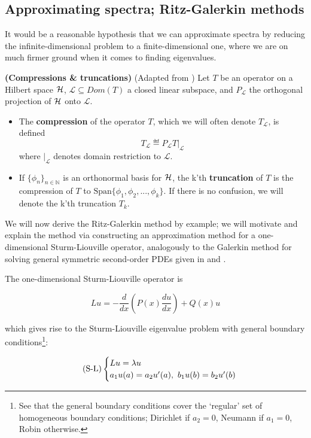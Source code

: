 \documentclass[../main.tex]{subfiles}
\begin{document}
\subsection{Approximating spectra; Ritz-Galerkin methods}

It would be a reasonable hypothesis that we can approximate spectra by reducing the infinite-dimensional problem to a finite-dimensional one, where
we are on much firmer ground when it comes to finding eigenvalues.

\begin{definition}{\textbf{(Compressions \& truncations)}}
(Adapted from \parencite{davies1995spectral})
Let $T$ be an operator on a Hilbert space $\mathcal{H}$, $\mathcal{L} \subseteq Dom(T)$ a closed linear subspace, and $P_\mathcal{L}$ the orthogonal projection
of $\mathcal{H}$ onto $\mathcal{L}$.
\begin{itemize}
\item The \textbf{compression} of the operator $T$, which we will often denote $T_\mathcal{L}$, is defined
$$T_\mathcal{L} \eqdef P_\mathcal{L} T\big|_{\mathcal{L}}$$
where $\big|_{\mathcal{L}}$ denotes domain restriction to $\mathcal{L}$.
\item If $\{\phi_n\}_{n \in \mathbb{N}}$ is an orthonormal basis for $\mathcal{H}$, the k'th \textbf{truncation} of $T$ is the compression of $T$ to $\text{Span}\{\phi_1, \phi_2, ..., \phi_k\}$. If there is no confusion, we will denote the k'th truncation $T_k$.
\end{itemize}
\end{definition}

We will now derive the Ritz-Galerkin method by example; we will motivate and explain the method via constructing an approximation method for a one-dimensional Sturm-Liouville operator, analogously to the Galerkin method for solving general symmetric second-order PDEs given in \cite{suli2003introduction} and \cite{pryce1993numerical}. 

The one-dimensional Sturm-Liouville operator is

$$Lu = - \frac{d}{dx}(P(x)\frac{du}{dx}) + Q(x)u$$ 

which gives rise to the Sturm-Liouville eigenvalue problem with general boundary conditions\footnote{See that the general boundary conditions cover the `regular' set of homogeneous boundary conditions; Dirichlet if $a_2 = 0$, Neumann if $a_1 = 0$, Robin otherwise.}:

\begin{equation*}\label{eqn:sturm-liouville}
\tag{S-L}
\begin{cases}
Lu = \lambda u$$ \\
a_1 u(a) = a_2 u'(a), \ b_1 u(b) = b_2 u'(b)
\end{cases}
\end{equation*}
\end{document}
